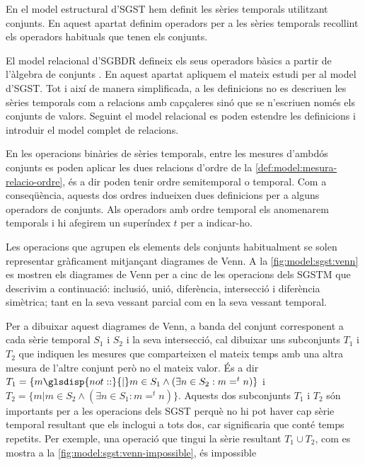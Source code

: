 En el model estructural d'\gls{SGST} hem definit les sèries temporals
utilitzant conjunts. En aquest apartat definim operadors per a les
sèries temporals recollint els operadors habituals que tenen els
conjunts.   

El model relacional d'\gls{SGBDR} defineix els seus operadors bàsics
a partir de l'àlgebra de
conjunts \parencite[cap.~7]{date04:introduction8}. En aquest apartat
apliquem el mateix estudi per al model d'\gls{SGST}. Tot i així de
manera simplificada, a les definicions no es descriuen les sèries
temporals com a relacions amb capçaleres sinó que se n'escriuen només
els conjunts de valors. Seguint el model relacional es poden estendre
les definicions i introduir el model complet de relacions.



En les operacions binàries de sèries temporals, entre les mesures
d'ambdós conjunts es poden aplicar les dues relacions d'ordre de la
\autoref{def:model:mesura-relacio-ordre}, és a dir poden tenir ordre
semitemporal o temporal. Com a conseqüència, aquests dos ordres
indueixen dues definicions per a alguns operadors de conjunts. Als
operadors amb ordre temporal els anomenarem temporals i hi afegirem un
superíndex $t$ per a indicar-ho.


Les operacions que agrupen els elements dels conjunts habitualment se
solen representar gràficament mitjançant diagrames de Venn. A la
\autoref{fig:model:sgst:venn} es mostren els diagrames de Venn per a
cinc de les operacions dels \gls{SGSTM} que descrivim a continuació:
inclusió, unió, diferència, intersecció i diferència simètrica; tant
en la seva vessant parcial com en la seva vessant temporal.  

Per a dibuixar aquest diagrames de Venn, a banda del conjunt
corresponent a cada sèrie temporal $S_1$ i $S_2$ i la seva intersecció,
cal dibuixar uns subconjunts $T_1$ i $T_2$ que indiquen les mesures
que comparteixen el mateix temps amb una altra mesura de l'altre
conjunt però no el mateix valor. És a dir $T_1 = \{ m
\glsdisp{not::}{|} m \in S_1 \wedge (\exists n \in S_2: m =^t n) \}$ i
$T_2 = \{ m | m \in S_2 \wedge (\exists n \in S_1: m =^t n) \}$.  Aquests dos
subconjunts $T_1$ i $T_2$ són importants per a les operacions dels
\gls{SGST} perquè no hi pot haver cap sèrie temporal resultant que els
inclogui a tots dos, car significaria que conté temps repetits. Per
exemple, una operació que tingui la sèrie resultant $T_1 \cup T_2$,
com es mostra a la \autoref{fig:model:sgst:venn-impossible}, és
impossible


